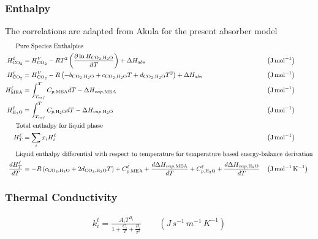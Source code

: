             \subsubsection{Enthalpy}
                The correlations are adapted from Akula \cite{Akula2023} for the present absorber model
                \begin{align}
                    \shortintertext{\quad\; Pure Species Enthalpies}
                    H^{\liq}_{\COtwo} &= H_{\text{CO}_2}^V - RT^2 \left( \frac{\partial \ln H_{\text{CO}_2, \text{H}_2\text{O}}}{\partial T} \right) + \Delta H_{abs}
                    && \left(\unit{J\,mol^{-1}}\right)\\
                    H^{\liq}_{\COtwo} &= H_{\text{CO}_2}^V - R \left( -b_{\text{CO}_2, \text{H}_2\text{O}} + c_{\text{CO}_2, \text{H}_2\text{O}} T + d_{\text{CO}_2, \text{H}_2\text{O}} T^2 \right) + \Delta H_{abs}
                    && \left(\unit{J\,mol^{-1}}\right)\\
                    H^{\liq}_{\MEA} &= \int_{T_{ref}}^{T} C_{p,\MEA} dT - \Delta H_{vap, \MEA}
                    && \left(\unit{J\,mol^{-1}}\right)\\
                    H^{\liq}_{\HtwoO} &= \int_{T_{ref}}^{T} C_{p,\HtwoO} dT - \Delta H_{vap, \HtwoO}
                    && \left(\unit{J\,mol^{-1}}\right)\\
                    \shortintertext{\quad\; Total enthalpy for liquid phase}
                    H^{\liq}_{T} &= \sum_{i} x_iH^{\liq}_{i}
                    && \left(\unit{J\,mol^{-1}}\right)\\
                    \shortintertext{\quad\; Liquid enthalpy differential with respect to temperature for temperature based energy-balance derivation}
                    \frac{dH^{\liq}_{T}}{dT} &= -R\left(c_{\text{CO}_2, \text{H}_2\text{O}}  + 2d_{\text{CO}_2, \text{H}_2\text{O}} T \right) + C^{\liq}_{p, \MEA} + \frac{d\Delta H_{vap, \MEA}}{dT} +  C^{\liq}_{p, \HtwoO}+ \frac{d\Delta H_{vap, \HtwoO}}{dT}
                    && \left(\unit{J\,mol^{-1}\,K^{-1}}\right)
                \end{align}

            \subsubsection{Thermal Conductivity}
                \begin{align}
                    k^{t}_{i} = \frac{A_i T^{B_i}}{1 + \frac{C_i}{T} + \frac{D_i}{T^2}}
                    \qquad \left(\unit{J\,s^{-1}\,m^{-1}\,K^{-1}}\right)
                \end{align}

